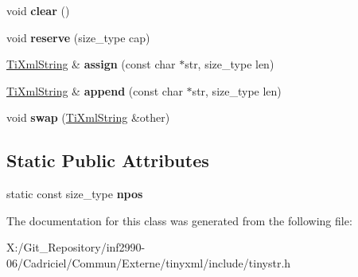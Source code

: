 \begin{DoxyCompactItemize}
\item 
\hypertarget{class_ti_xml_string_ab20e06e4c666abf3bdbfb3a1191d4888}{void {\bfseries clear} ()}\label{class_ti_xml_string_ab20e06e4c666abf3bdbfb3a1191d4888}

\item 
\hypertarget{class_ti_xml_string_a88ecf9f0f00cb5c67b6b637958d7049c}{void {\bfseries reserve} (size\-\_\-type cap)}\label{class_ti_xml_string_a88ecf9f0f00cb5c67b6b637958d7049c}

\item 
\hypertarget{class_ti_xml_string_afe4cd3452ccd7cd8c8cac16e24ea28d7}{\hyperlink{class_ti_xml_string}{Ti\-Xml\-String} \& {\bfseries assign} (const char $\ast$str, size\-\_\-type len)}\label{class_ti_xml_string_afe4cd3452ccd7cd8c8cac16e24ea28d7}

\item 
\hypertarget{class_ti_xml_string_a717b00190c8acdee94816d2f4f20e75a}{\hyperlink{class_ti_xml_string}{Ti\-Xml\-String} \& {\bfseries append} (const char $\ast$str, size\-\_\-type len)}\label{class_ti_xml_string_a717b00190c8acdee94816d2f4f20e75a}

\item 
\hypertarget{class_ti_xml_string_aa392cbc180752a79f007f4f9280c7762}{void {\bfseries swap} (\hyperlink{class_ti_xml_string}{Ti\-Xml\-String} \&other)}\label{class_ti_xml_string_aa392cbc180752a79f007f4f9280c7762}

\end{DoxyCompactItemize}
\subsection*{Static Public Attributes}
\begin{DoxyCompactItemize}
\item 
\hypertarget{class_ti_xml_string_a1aa6260982d3a63f0c822fe40fd7b37f}{static const size\-\_\-type {\bfseries npos}}\label{class_ti_xml_string_a1aa6260982d3a63f0c822fe40fd7b37f}

\end{DoxyCompactItemize}


The documentation for this class was generated from the following file\-:\begin{DoxyCompactItemize}
\item 
X\-:/\-Git\-\_\-\-Repository/inf2990-\/06/\-Cadriciel/\-Commun/\-Externe/tinyxml/include/tinystr.\-h\end{DoxyCompactItemize}

